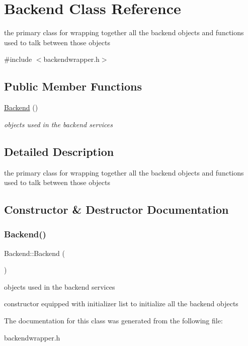 \hypertarget{classBackend}{}\section{Backend Class Reference}
\label{classBackend}


the primary class for wrapping together all the backend objects and functions used to talk between those objects  




{\ttfamily \#include $<$backendwrapper.\+h$>$}

\subsection*{Public Member Functions}
\begin{DoxyCompactItemize}
\item 
\mbox{\hyperlink{classBackend_a1a46af8e9525762a3b7bbf199b852bf6}{Backend}} ()
\begin{DoxyCompactList}\small\item\em objects used in the backend services \end{DoxyCompactList}\end{DoxyCompactItemize}


\subsection{Detailed Description}
the primary class for wrapping together all the backend objects and functions used to talk between those objects 

\subsection{Constructor \& Destructor Documentation}
\mbox{\label{classBackend_a1a46af8e9525762a3b7bbf199b852bf6}} 
\subsubsection{\texorpdfstring{Backend()}{Backend()}}
{\footnotesize\ttfamily Backend\+::\+Backend (\begin{DoxyParamCaption}{ }\end{DoxyParamCaption})\hspace{0.3cm}{\ttfamily [inline]}}



objects used in the backend services 

constructor equipped with initializer list to initialize all the backend objects 

The documentation for this class was generated from the following file\+:\begin{DoxyCompactItemize}
\item 
backendwrapper.\+h\end{DoxyCompactItemize}
